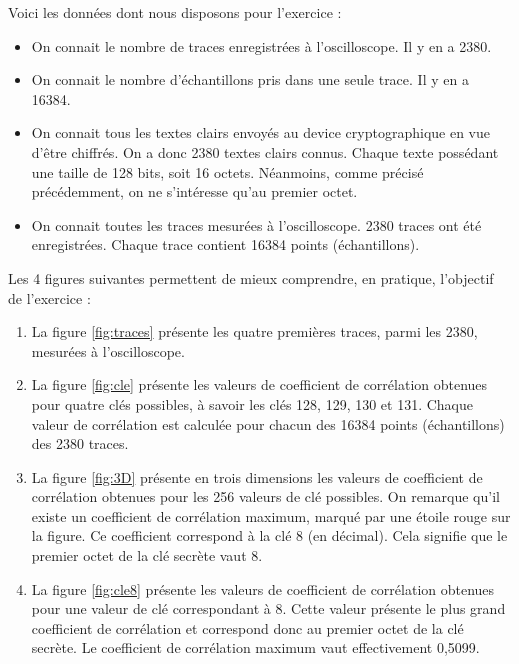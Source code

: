 \documentclass[10pt, oneside, a4paper]{article}
\begin{document}
\hspace{-0.5 cm}Voici les données dont nous disposons pour l'exercice :
\begin{itemize}
\item On connait le nombre de traces enregistrées à l'oscilloscope. Il y en a 2380.
\item On connait le nombre d'échantillons pris dans une seule trace. Il y en a 16384.
\item On connait tous les textes clairs envoyés au device cryptographique en vue d'être chiffrés. On a donc 2380 textes clairs connus. Chaque texte possédant une taille de 128 bits, soit 16 octets. Néanmoins, comme précisé précédemment, on ne s'intéresse qu'au premier octet.
\item On connait toutes les traces mesurées à l'oscilloscope. 2380 traces ont été enregistrées. Chaque trace contient 16384 points (échantillons). \\
\end{itemize}

\hspace{-0.5 cm}Les 4 figures suivantes permettent de mieux comprendre, en pratique, l'objectif de l'exercice :
\begin{enumerate}
\item La figure \ref{fig:traces} présente les quatre premières traces, parmi les 2380, mesurées à l'oscilloscope.
\item La figure \ref{fig:cle} présente les valeurs de coefficient de corrélation obtenues pour quatre clés possibles, à savoir les clés 128, 129, 130 et 131. Chaque valeur de corrélation est calculée pour chacun des 16384 points (échantillons) des 2380 traces. 
\item La figure \ref{fig:3D} présente en trois dimensions les valeurs de coefficient de corrélation obtenues pour les 256 valeurs de clé possibles. On remarque qu'il existe un coefficient de corrélation maximum, marqué par une étoile rouge sur la figure. Ce coefficient correspond à la clé 8 (en décimal). Cela signifie que le premier octet de la clé secrète vaut 8. 
\item La figure \ref{fig:cle8} présente les valeurs de coefficient de corrélation obtenues pour une valeur de clé correspondant à 8. Cette valeur présente le plus grand coefficient de corrélation et correspond donc au premier octet de la clé secrète. Le coefficient de corrélation maximum vaut effectivement 0,5099.
\end{enumerate}
\end{document}
